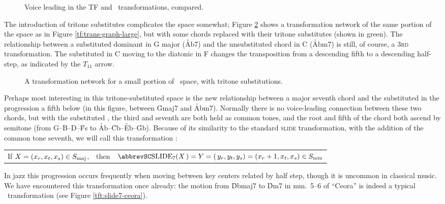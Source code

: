 \begin{figure}[tbp]
  \caption{Voice leading in the TF and \tft\ transformations, compared.}
  \label{tft:voice-leading-tft}
\end{figure}

The introduction of tritone substitutes complicates the space somewhat; Figure
\ref{tft:tft-space-extract} shows a transformation network of the same portion
of the space as in Figure \ref{tf:trans-graph-large}, but with some chords
replaced with their tritone substitutes (shown in green). The relationship
between a substituted dominant in G major (\h{Ab7}) and the unsubstituted \ii
chord in C (\h{Abm7}) is still, of course, a \textsc{3rd} transformation. The
substituted \V in C moving to the diatonic \V in F changes the
transposition from a descending fifth to a descending half-step, as indicated
by the $T_{11}$ arrow.

\begin{figure}[tbp]
  \caption{A transformation network for a small portion of \tf\ space, with
    tritone substitutions.}
  \label{tft:tft-space-extract}
\end{figure}

Perhaps most interesting in this tritone-substituted space is the new
relationship between a major seventh chord and the substituted \ii in
the progression a fifth below (in this figure, between \h{Gmaj7} and \h{Abm7}).
Normally there is no voice-leading connection between these two chords, but
with the substituted \ii, the third and seventh are both held as common
tones, and the root and fifth of the chord both ascend by semitone (from
G--B--D--\h{Fs} to \h{Ab}--\h{Cb}--\h{Eb}--\h{Gb}). Because of its
similarity to the standard \textsc{slide} transformation, with the addition of
the common tone seventh, we will call this transformation \slideS: \\
%
\vspace{0.5\baselineskip}
\begin{tabular}{lcl}
  If $X = (x_r, x_t, x_s) \in S_{\mathrm{maj}}$, & then &
    $\text{\slideS}(X\,) = Y = (\,y_r, y_t, y_s) = (x_r +1, x_t, x_s) \in \Smin$
\end{tabular}
\vspace{0.5\baselineskip}

\noindent In jazz this progression occurs frequently when moving between key
centers related by half step, though it is uncommon in classical
music. We have encountered this transformation once already: the
motion from \h{Dbmaj7} to \h{Dm7} in mm.~5--6 of ``Ceora'' is indeed a typical
\slideS\ transformation (see Figure \ref{tft:slide7-ceora}).

